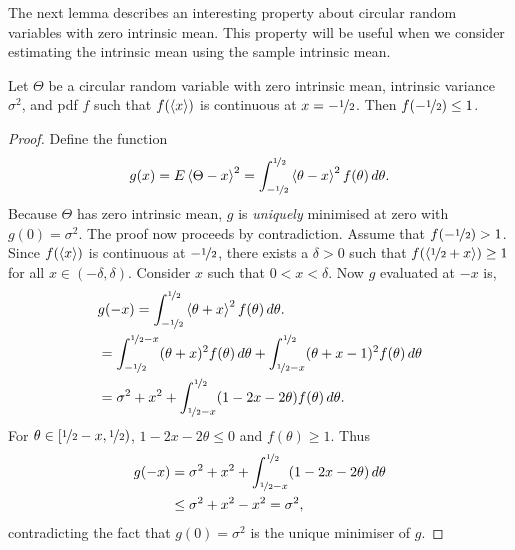 \documentclass[journal]{IEEEtran}
\begin{document}

The next lemma describes an interesting property about circular random variables with zero intrinsic mean.  This property will be useful when we consider estimating the intrinsic mean using the sample intrinsic mean. 

\begin{lemma}\label{lem:antipolalzerounwpmean}
Let $\Theta$ be a circular random variable with zero intrinsic mean, intrinsic variance $\sigma^2$, and pdf $f$ such that $f(\left< x \right>)$ is continuous at $x = -\nicefrac{1}{2}$.  Then $f(-\nicefrac{1}{2}) \leq 1$.
\end{lemma}
\begin{proof}
Define the function
\[
g(x) = E\left< \Theta - x \right>^2 = \int_{-\nicefrac{1}{2}}^{\nicefrac{1}{2}}\left< \theta - x \right>^2f(\theta) \, d\theta.
\]
Because $\Theta$ has zero intrinsic mean, $g$ is \emph{uniquely} minimised at zero with $g(0) = \sigma^2$.  The proof now proceeds by contradiction. Assume that $f(-\nicefrac{1}{2}) > 1$.  Since $f(\left< x \right>)$ is continuous at $-\nicefrac{1}{2}$, there exists a $\delta > 0$ such that $f(\left< \nicefrac{1}{2} + x \right>) \geq 1$ for all $x \in (-\delta, \delta)$.  Consider $x$ such that $0 < x < \delta$.  Now $g$ evaluated at $-x$ is,
\begin{align*}
&g(-x) = \int_{-\nicefrac{1}{2}}^{\nicefrac{1}{2}}\left< \theta + x \right>^2 f(\theta) \, d\theta. \\
&= \int_{-\nicefrac{1}{2}}^{\nicefrac{1}{2} - x}(\theta + x)^2 f(\theta) \, d\theta + \int_{\nicefrac{1}{2} - x}^{\nicefrac{1}{2}}(\theta + x - 1)^2 f(\theta) \, d\theta \\
&= \sigma^2 + x^2 + \int_{\nicefrac{1}{2} - x}^{\nicefrac{1}{2}}(1 - 2x - 2\theta)f(\theta) \, d\theta.
\end{align*}
For $\theta \in [\nicefrac{1}{2} - x, \nicefrac{1}{2})$, $1 - 2x - 2\theta \leq 0$ and $f(\theta) \geq 1$. Thus
\begin{align*}
g(-x) &= \sigma^2 + x^2 + \int_{\nicefrac{1}{2} - x}^{\nicefrac{1}{2}}(1 - 2x - 2\theta) \, d\theta \\
&\leq \sigma^2 + x^2 - x^2 = \sigma^2,
\end{align*}
contradicting the fact that $g(0) = \sigma^2$ is the unique minimiser of $g$.
\end{proof}
\end{document}
